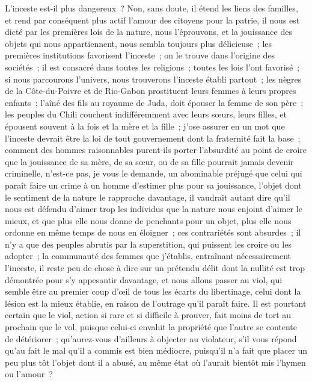 \documentclass[french,twoside]{book} %
\begin{document}
L’inceste est-il plus dangereux ? Non, sans doute, il étend les liens des familles, et rend par conséquent plus actif l’amour des citoyens pour la patrie, il nous est dicté par les premières lois de la nature, nous l’éprouvons, et la jouissance des objets qui nous appartiennent, nous sembla toujours plus délicieuse ; les premières institutions favorisent l’inceste ; on le trouve dans l’origine des sociétés ; il est consacré dans toutes les religions ; toutes les lois l’ont favorisé ; si nous parcourons l’univers, nous trouverons l’inceste établi partout ; les nègres de la Côte-du-Poivre et de Rio-Gabon prostituent leurs femmes à leurs propres enfants ; l’aîné des fils au royaume de Juda, doit épouser la femme de son père ; les peuples du Chili couchent indifféremment avec leurs sœurs, leurs filles, et épousent souvent à la fois et la mère et la fille ; j’ose assurer en un mot que l’inceste devrait être la loi de tout gouvernement dont la fraternité fait la base ; comment des hommes raisonnables purent-ils porter l’absurdité au point de croire que la jouissance de sa mère, de sa sœur, ou de sa fille pourrait jamais devenir criminelle, n’est-ce pas, je vous le demande, un abominable préjugé que celui qui paraît faire un crime à un homme d’estimer plus pour sa jouissance, l’objet dont le sentiment de la nature le rapproche davantage, il vaudrait autant dire qu’il nous est défendu d’aimer trop les individus que la nature nous enjoint d’aimer le mieux, et que plus elle nous donne de penchants pour un objet, plus elle nous ordonne en même temps de nous en éloigner ; ces contrariétés sont absurdes ; il n’y a que des peuples abrutis par la superstition, qui puissent les croire ou les adopter ; la communauté des femmes que j’établis, entraînant nécessairement l’inceste, il reste peu de chose à dire sur un prétendu délit dont la nullité est trop démontrée pour s’y appesantir davantage, et nous allons passer au viol, qui semble être au premier coup d’œil de tous les écarts du libertinage, celui dont la lésion est la mieux établie, en raison de l’outrage qu’il paraît faire. Il est pourtant certain que le viol, action si rare et si difficile à prouver, fait moins de tort au prochain que le vol, puisque celui-ci envahit la propriété que l’autre se contente de détériorer ; qu’aurez-vous d’ailleurs à objecter au violateur, s’il vous répond qu’au fait le mal qu’il a commis est bien médiocre, puisqu’il n’a fait que placer un peu plus tôt l’objet dont il a abusé, au même état où l’aurait bientôt mis l’hymen ou l’amour ?\par
\end{document}
